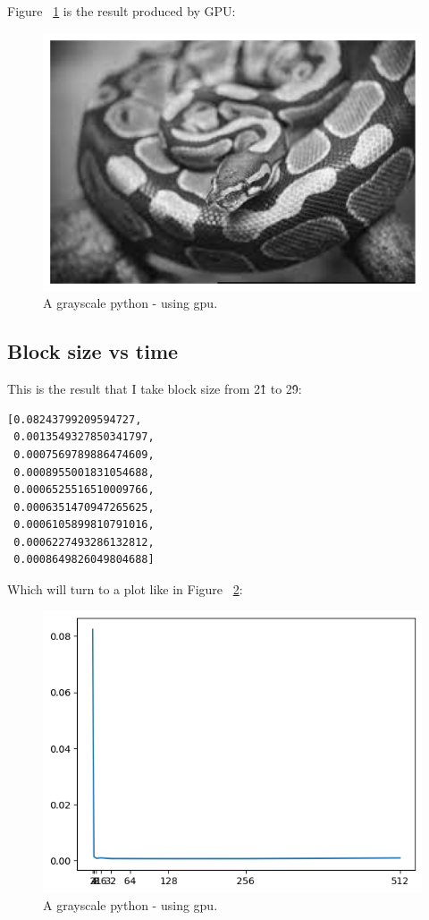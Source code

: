 \documentclass{article}
\begin{document}
Figure ~\ref{fig:gpu_python} is the result produced by GPU:

\begin{figure}
  \includegraphics[width=\linewidth]{gpu_python.png}
  \caption{A grayscale python - using gpu.}
  \label{fig:gpu_python}
\end{figure}

\subsection{Block size vs time}
This is the result that I take block size from 2\^1 to 2\^9:
\begin{verbatim}
[0.08243799209594727,
 0.0013549327850341797,
 0.0007569789886474609,
 0.0008955001831054688,
 0.0006525516510009766,
 0.0006351470947265625,
 0.0006105899810791016,
 0.0006227493286132812,
 0.0008649826049804688]
\end{verbatim}
Which will turn to a plot like in Figure ~\ref{fig:plot}:
\begin{figure}
  \includegraphics[width=\linewidth]{plot.png}
  \caption{A grayscale python - using gpu.}
  \label{fig:plot}
\end{figure}
\end{document}
